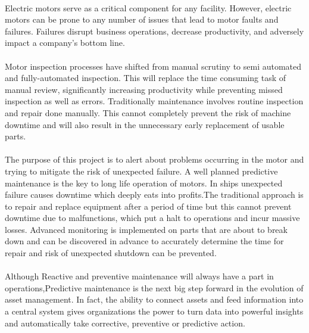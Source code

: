 \paragraph{}Electric motors serve as a critical component for any facility. However, electric motors can be prone to any number of issues that lead to motor faults and failures. Failures disrupt business operations, decrease productivity, and adversely impact a company’s bottom line.
\paragraph{}Motor inspection processes have shifted from manual scrutiny to semi automated and fully-automated inspection. This will replace the time consuming task of manual review, significantly increasing productivity while preventing missed inspection as well as errors.
Traditionally maintenance involves routine inspection and repair done manually. This cannot completely prevent the risk of machine downtime and will also result in the unnecessary early replacement of usable parts.
\cite{ritchie_comparative_2000}
\paragraph{}The purpose of this project is to alert about problems occurring in the motor and trying to mitigate the risk of unexpected failure. A well planned predictive maintenance is the key to long life operation of motors. In ships unexpected failure causes downtime which deeply eats into profits.The traditional approach is to repair and replace equipment after a period of time but this cannot prevent downtime due to malfunctions, which put a halt to operations and incur massive losses. Advanced monitoring is implemented on parts that are about to break down and can be discovered in advance to accurately determine the time for repair and risk of unexpected shutdown can be prevented.
 \cite{xu_hierarchical_2010}
\paragraph{}  Although Reactive and preventive maintenance will always have a part in operations,Predictive maintenance is the next big step forward in the evolution of asset management. In fact, the ability to connect assets and feed information into a central system gives organizations the power to turn data into powerful insights and automatically take corrective, preventive or predictive action.
